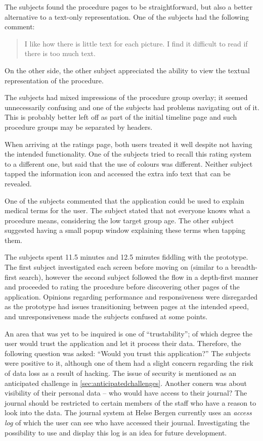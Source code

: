 The subjects found the procedure pages to be straightforward, but also a better alternative to a text-only representation. One of the subjects had the following comment:

\begin{quote}
    I like how there is little text for each picture. I find it difficult to read if there is too much text.
\end{quote}

On the other side, the other subject appreciated the ability to view the textual representation of the procedure.

The subjects had mixed impressions of the procedure group overlay; it seemed unnecessarily confusing and one of the subjects had problems navigating out of it. This is probably better left off as part of the initial timeline page and such procedure groups may be separated by headers.

When arriving at the ratings page, both users treated it well despite not having the intended functionality. One of the subjects tried to recall this rating system to a different one, but said that the use of colours was different. Neither subject tapped the information icon and accessed the extra info text that can be revealed.

One of the subjects commented that the application could be used to explain medical terms for the user. The subject stated that not everyone knows what a procedure means, considering the low target group age. The other subject suggested having a small popup window explaining these terms when tapping them.

The subjects spent 11.5 minutes and 12.5 minutes fiddling with the prototype. The first subject investigated each screen before moving on (similar to a breadth-first search), however the second subject followed the flow in a depth-first manner and proceeded to rating the procedure before discovering other pages of the application. Opinions regarding performance and responsiveness were disregarded as the prototype had issues transitioning between pages at the intended speed, and unresponsiveness made the subjects confused at some points.

An area that was yet to be inquired is one of \enquote{trustability}; of which degree the user would trust the application and let it process their data. Therefore, the following question was asked: \enquote{Would you trust this application?} The subjects were positive to it, although one of them had a slight concern regarding the risk of data loss as a result of hacking. The issue of security is mentioned as an anticipated challenge in \autoref{sec:anticipatedchallenges}. Another conern was about visibility of their personal data -- who would have access to their journal? The journal should be restricted to certain members of the staff who have a reason to look into the data. The journal system at Helse Bergen currently uses an \emph{access log} of which the user can see who have accessed their journal. Investigating the possibility to use and display this log is an idea for future development.
